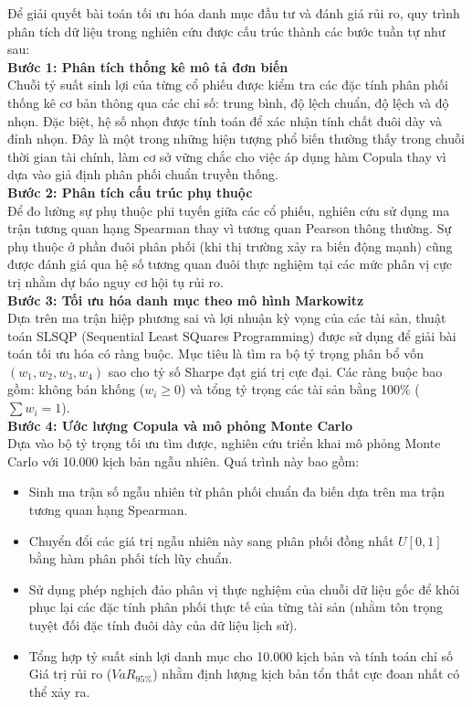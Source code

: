 Để giải quyết bài toán tối ưu hóa danh mục đầu tư và đánh giá rủi ro, quy trình phân tích dữ liệu trong nghiên cứu được cấu trúc thành các bước tuần tự như sau:\\
\textbf{Bước 1: Phân tích thống kê mô tả đơn biến}\\
Chuỗi tỷ suất sinh lợi của từng cổ phiếu được kiểm tra các đặc tính phân phối thống kê cơ bản thông qua các chỉ số:  trung bình, độ lệch chuẩn, độ lệch và độ nhọn. Đặc biệt, hệ số nhọn được tính toán để xác nhận tính chất đuôi dày và đỉnh nhọn. Đây là một trong những hiện tượng phổ biến thường thấy trong chuỗi thời gian tài chính, làm cơ sở vững chắc cho việc áp dụng hàm Copula thay vì dựa vào giả định phân phối chuẩn truyền thống.\\
\textbf{Bước 2: Phân tích cấu trúc phụ thuộc}\\
Để đo lường sự phụ thuộc phi tuyến giữa các cổ phiếu, nghiên cứu sử dụng ma trận tương quan hạng Spearman thay vì tương quan Pearson thông thường. Sự phụ thuộc ở phần đuôi phân phối (khi thị trường xảy ra biến động mạnh) cũng được đánh giá qua hệ số tương quan đuôi thực nghiệm tại các mức phân vị cực trị nhằm dự báo nguy cơ hội tụ rủi ro.\\
\textbf{Bước 3: Tối ưu hóa danh mục theo mô hình Markowitz}\\
Dựa trên ma trận hiệp phương sai và lợi nhuận kỳ vọng của các tài sản, thuật toán SLSQP (Sequential Least SQuares Programming) được sử dụng để giải bài toán tối ưu hóa có ràng buộc. Mục tiêu là tìm ra bộ tỷ trọng phân bổ vốn $(w_1, w_2, w_3, w_4)$ sao cho tỷ số Sharpe đạt giá trị cực đại. Các ràng buộc bao gồm: không bán khống ($w_i \geq 0$) và tổng tỷ trọng các tài sản bằng 100\% ($\sum w_i = 1$).\\
\textbf{Bước 4: Ước lượng Copula và mô phỏng Monte Carlo}\\
Dựa vào bộ tỷ trọng tối ưu tìm được, nghiên cứu triển khai mô phỏng Monte Carlo với 10.000 kịch bản ngẫu nhiên. Quá trình này bao gồm:
\begin{itemize}
    \item Sinh ma trận số ngẫu nhiên từ phân phối chuẩn đa biến dựa trên ma trận tương quan hạng Spearman.
    \item Chuyển đổi các giá trị ngẫu nhiên này sang phân phối đồng nhất $U[0,1]$ bằng hàm phân phối tích lũy chuẩn.
    \item Sử dụng phép nghịch đảo phân vị thực nghiệm của chuỗi dữ liệu gốc để khôi phục lại các đặc tính phân phối thực tế của từng tài sản (nhằm tôn trọng tuyệt đối đặc tính đuôi dày của dữ liệu lịch sử).
    \item Tổng hợp tỷ suất sinh lợi danh mục cho 10.000 kịch bản và tính toán chỉ số Giá trị rủi ro ($VaR_{95\%}$) nhằm định lượng kịch bản tổn thất cực đoan nhất có thể xảy ra.
\end{itemize}